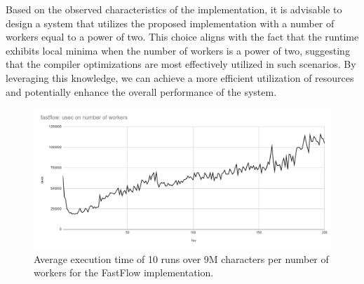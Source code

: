 \documentclass[10pt]{article}
\begin{document}
Based on the observed characteristics of the implementation, it is advisable to design a system that utilizes the proposed implementation with a number of workers equal to a power of two. This choice aligns with the fact that the runtime exhibits local minima when the number of workers is a power of two, suggesting that the compiler optimizations are most effectively utilized in such scenarios. By leveraging this knowledge, we can achieve a more efficient utilization of resources and potentially enhance the overall performance of the system.
\begin{figure}[H]
\begin{center}
	\includegraphics[scale=.6]{scalability_fastflow.png}
\end{center}
\caption{Average execution time of 10 runs over 9M characters per number of workers for the FastFlow implementation.}
\label{figure:Scalability_fastflow}
\end{figure}
\end{document}
